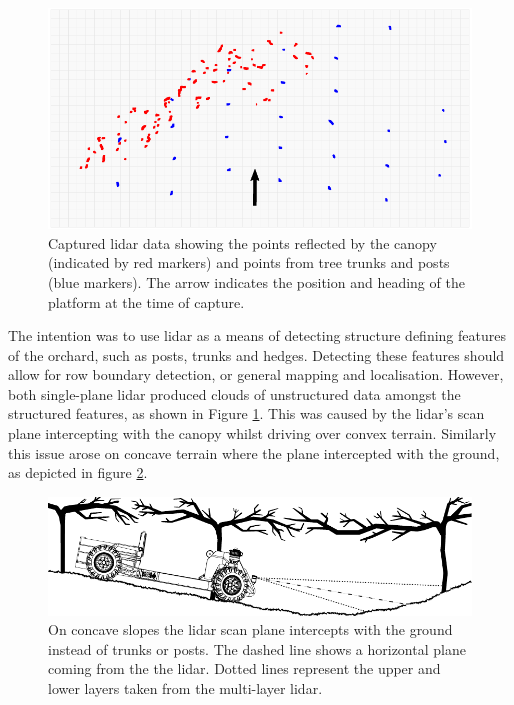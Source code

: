 \documentclass[preprint,authoryear,12pt]{elsarticle}
\begin{document}
        \begin{figure}[htb]
            \centering
            \includegraphics[width=\linewidth]{imgs/canopy_data/canopy_data.pdf}
            \caption{
                Captured lidar data showing the points reflected by the canopy (indicated by red markers) and points from tree trunks and posts (blue markers).
                The arrow indicates the position and heading of the platform at the time of capture.
            }
            \label{fig:canopyDataCloud}
        \end{figure}

        The intention was to use lidar as a means of detecting structure defining features of the orchard, such as posts, trunks and hedges.
        Detecting these features should allow for row boundary detection, or general mapping and localisation.
        However, both single-plane lidar produced clouds of unstructured data amongst the structured features, as shown in Figure \ref{fig:canopyDataCloud}.
        This was caused by the lidar's scan plane intercepting with the canopy whilst driving over convex terrain.
        Similarly this issue arose on concave terrain where the plane intercepted with the ground, as depicted in figure \ref{fig:concaveSlope}.

        \begin{figure}[htb]
            \centering
            \includegraphics[width=\linewidth]{imgs/concave_slope/concave_slope_v4.pdf}
            \caption{
                On concave slopes the lidar scan plane intercepts with the ground instead of trunks or posts.
                The dashed line shows a horizontal plane coming from the the lidar.
                Dotted lines represent the upper and lower layers taken from the multi-layer lidar.
            }
            \label{fig:concaveSlope}
        \end{figure}
\end{document}
